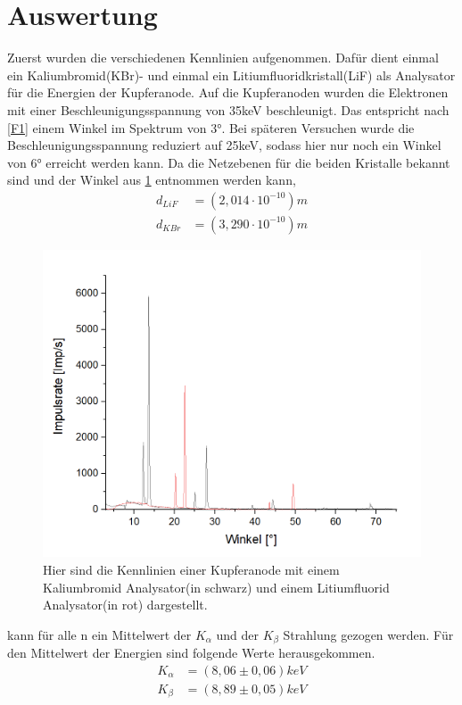 \documentclass[
	a4paper,
	12pt,
	pagesize,
	ngerman
]{scrartcl}
\begin{document}
\section{Auswertung}
Zuerst wurden die verschiedenen Kennlinien aufgenommen. Dafür dient einmal ein Kaliumbromid(KBr)- und einmal ein Litiumfluoridkristall(LiF) als Analysator für die Energien der Kupferanode. Auf die Kupferanoden wurden die Elektronen mit einer Beschleunigungsspannung von 35keV beschleunigt. Das entspricht nach \cref{F1} einem Winkel im Spektrum von 3°. Bei späteren Versuchen wurde die Beschleunigungsspannung reduziert auf 25keV, sodass hier nur noch ein Winkel von 6° erreicht werden kann. Da die Netzebenen für die beiden Kristalle bekannt sind und der Winkel aus \cref{A1} entnommen werden kann,
\begin{align*}
    d_{LiF} &= (2,014 \cdot 10^{-10})m \\
    d_{KBr} &= (3,290 \cdot 10^{-10})m  
\end{align*}
\begin{figure}[h!]
    \centering
    \includegraphics[scale = 0.6]{lif-kbr.png}
    \caption{Hier sind die Kennlinien einer Kupferanode mit einem Kaliumbromid Analysator(in schwarz) und einem Litiumfluorid Analysator(in rot) dargestellt.}
    \label{A1}
\end{figure}
kann für alle n ein Mittelwert der $K_{\alpha}$ und der $K_{\beta}$ Strahlung gezogen werden. Für den Mittelwert der Energien sind folgende Werte herausgekommen.
\begin{align*}
    K_{\alpha} &= (8,06 \pm 0,06) keV \\
    K_{\beta} &= (8,89 \pm 0,05) keV
\end{align*}
\end{document}
